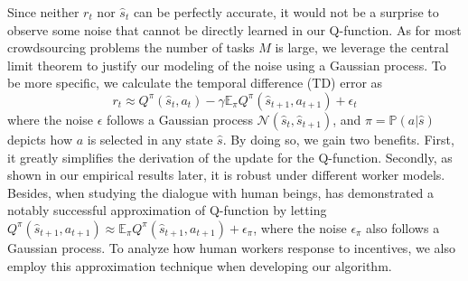 Since neither $r_t$ nor $\hat{s}_t$ can be perfectly accurate, it would not be a surprise to observe some noise that cannot be directly learned in our Q-function. %
As for most crowdsourcing problems the number of tasks $M$ is large, we leverage the central limit theorem to justify our modeling of the noise using a Gaussian process.
To be more specific, we calculate the temporal difference (TD) error as 
\begin{equation}
r_t \approx Q^\pi(\hat{s}_t, a_t) - \gamma \mathbb{E}_{\pi}Q^{\pi}(\hat{s}_{t+1},a_{t+1}) + \epsilon_t 
\end{equation}
where the noise $\epsilon $ follows a Gaussian process $\mathcal{N}(\hat{s}_t,\hat{s}_{t+1})$, and $\pi=\mathbb{P}(a|\hat{s})$ depicts how $a$ is selected in any state $\hat{s}$.
By doing so, we gain two benefits. First, it greatly simplifies the derivation of the update for the Q-function. Secondly, as shown in our empirical results later, it is robust under different worker models.
Besides, when studying the dialogue with human beings, \citet{gasic2014gaussian} has demonstrated a notably successful approximation of Q-function by letting $Q^{\pi}(\hat{s}_{t+1},a_{t+1})\approx\mathbb{E}_{\pi}Q^{\pi}(\hat{s}_{t+1},a_{t+1})+\epsilon_{\pi}$, where the noise $\epsilon_{\pi}$ also follows a Gaussian process.
To analyze how human workers response to incentives, we also employ this approximation technique when developing our algorithm.

